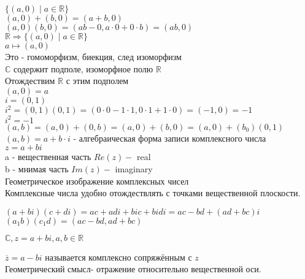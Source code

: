 $ \{ (a, 0) \mid a \in \mathbb{R}   \} $ \\
$ (a, 0) + (b, 0) = (a + b, 0) $ \\
$ (a, 0)(b, 0) = (ab - 0, a\cdot 0 + 0 \cdot b) = (ab, 0) $\\
$ \mathbb{R} \Rightarrow  \{ (a, 0) \mid a \in \mathbb{R}   \} $ \\
$ a \mapsto (a, 0) $ \\
Это - гомоморфизм, биекция, след изоморфизм \\
$ \mathbb{C} $ содержит подполе, изоморфное полю $ \mathbb{R} $\\
Отождествим $ \mathbb{R} $ с этим подполем \\
$ (a, 0) = a $ \\
$ i = (0, 1) $ \\
$ i^2 = (0, 1)(0,1) = (0 \cdot 0 - 1 \cdot 1 , 0 \cdot 1 + 1 \cdot 0) = (-1, 0) = -1 $ \\
$ i^2 = -1 $ \\
$ (a, b) = (a, 0) + (0, b) = (a, 0) + (b, 0) = (a, 0) + (b_0) (0, 1) $ \\
$ (a, b) = a + b \cdot i $ - алгебраическая форма записи комплексного числа \\
$ z = a + bi $ \\
a - вещественная часть $ Re(z) - $ real \\
b - мнимая часть $ Im(z) - $ imaginary \\
Геометрическое изображение комплексных чисел \\
Комплексные числа удобно отождествлять с точками вещественной плоскости. \\
\begin{remark}
	$ (a + bi) (c+di) = ac + adi + bic + bidi = ac - bd + (ad+bc)i $\\
	$ (a_1b)(c_1d) = (ac - bd, ad + bc) $ 
\end{remark}
$ \mathbb{C}, z = a + bi, a, b \in \mathbb{R} $ \\
\begin{definition}
	$\overline{z} = a - bi  $ называется комплексно сопряжённым с $ z $\\
	Геометрический смысл- отражение относительно вещественной оси. %
\end{definition}
